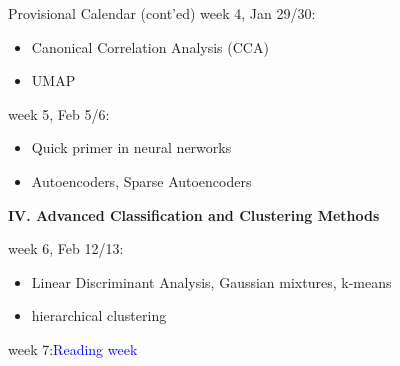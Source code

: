 \documentclass[11pt,handout,aspectratio=169]{beamer}
\begin{document}
\begin{frame}{Provisional Calendar (cont'ed)}
\small
week 4, Jan 29/30:\\[-1mm]
\begin{itemize}
\item Canonical Correlation Analysis (CCA)
\item UMAP
\end{itemize}

week 5, Feb 5/6:\\[-1mm]
  \begin{itemize}
  \item Quick primer in neural nerworks 
  \item Autoencoders, Sparse Autoencoders
  \end{itemize}

\noindent \textbf{IV. Advanced Classification and Clustering Methods}

week 6, Feb 12/13:\\[-1mm]
\begin{itemize}
\item Linear Discriminant Analysis, Gaussian mixtures, k-means
\item hierarchical clustering
\end{itemize}

week 7:\quad \textcolor{blue}{Reading week}
\end{frame}
\end{document}
